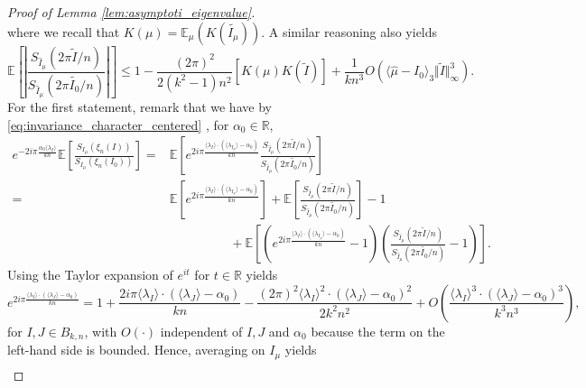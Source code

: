 \documentclass[10pt,11pt]{amsart}%
\begin{document}
\begin{proof}[Proof of Lemma \ref{lem:asymptoti_eigenvalue}]
\begin{equation}
\end{equation}
where we recall that $K(\mu)=\mathbb{E}_{\mu}(K(\widetilde{I_{\mu}}))$. A similar reasoning also yields 
\begin{equation}\label{eq:asymptotic_bound_eigenvalue_SUk}
\mathbb{E}\left[\left\vert\frac{S_{\hat{I}_{\mu}}(2\pi \tilde{I}/n)}{S_{\hat{I}_{\mu}}(2\pi\tilde{I_0}/n)}\right\vert\right]\leq1-\frac{(2\pi)^2}{2(k^2-1)n^2}\left[K(\mu)K(\tilde{I})\right]+\frac{1}{kn^3}O\left(\langle\hat{\mu}-I_0\rangle_3\Vert \tilde{I}\Vert_\infty^3\right).
\end{equation}
For the first statement, remark that we have by \eqref{eq:invariance_character_centered} , for $\alpha_0\in\mathbb{R}$,
\begin{align}
e^{-2i\pi \frac{\alpha_0\langle \lambda_I\rangle}{kn}}\mathbb{E}\left[\frac{S_{I_{\mu}}(\xi_{n}(I))}{S_{I_{\mu}}(\xi_{n}(I_0))}\right]=&\mathbb{E}\left[e^{2i\pi \frac{\langle \lambda_I\rangle\cdot(\langle \lambda_{I_{\mu}}\rangle-\alpha_0)}{kn}}\frac{S_{\hat{I}_{\mu}}(2\pi \tilde{I}/n)}{S_{\hat{I}_{\mu}}(2\pi\tilde{I_0}/n)}\right]\nonumber\\
=&\mathbb{E}\left[e^{2i\pi \frac{\langle \lambda_I\rangle\cdot(\langle \lambda_{I_{\mu}}\rangle-\alpha_0)}{kn}}\right]+\mathbb{E}\left[\frac{S_{\hat{I}_{\mu}}(2\pi \tilde{I}/n)}{S_{\hat{I}_{\mu}}(2\pi\tilde{I_0}/n)}\right]-1\nonumber\\
&\hspace{2cm}+\mathbb{E}\left[\left(e^{2i\pi \frac{\langle \lambda_I\rangle\cdot(\langle \lambda_{I_{\mu}}\rangle-\alpha_0)}{kn}}-1\right)\left(\frac{S_{\hat{I}_{\mu}}(2\pi \tilde{I}/n)}{S_{\hat{I}_{\mu}}(2\pi\tilde{I_0}/n)}-1\right)\right].\label{eq:final_estimate_decompo}
\end{align}
Using the Taylor expansion of $e^{it}$ for $t\in \mathbb{R}$ yields 
\begin{equation}\label{eq:asymptotic_eigenvalue_U1}
e^{2i\pi \frac{\langle \lambda_I\rangle\cdot(\langle \lambda_{J}\rangle-\alpha_0)}{kn}}=1+\frac{2i\pi \langle \lambda_I\rangle\cdot \left( \langle \lambda_J\rangle-\alpha_0\right)}{kn}-\frac{(2\pi)^2\langle \lambda_I\rangle^2\cdot \left( \langle \lambda_J\rangle-\alpha_0\right)^2}{2k^2n^2}+O\left(\frac{\langle \lambda_I\rangle^3\cdot\left( \langle \lambda_J\rangle-\alpha_0\right)^3}{k^3n^3}\right),
\end{equation}
for $I,J\in B_{k,n}$, with $O(\cdot)$ independent of $I,J$ and $\alpha_0$ because the term on the left-hand side is bounded. Hence, averaging on $I_{\mu}$ yields 
\begin{align}

\end{align}
\end{proof}
\end{document}
